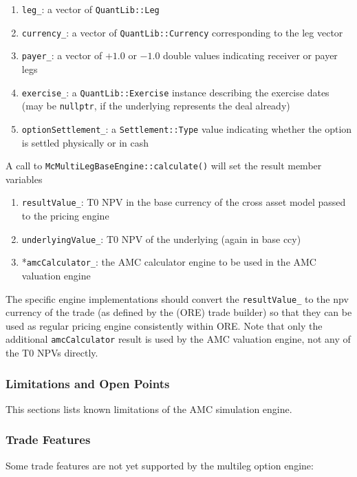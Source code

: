 \documentclass[12pt, a4paper]{article}
\begin{document}
{\begin{appendix}
\begin{enumerate}
\item \verb+leg_+: a vector of \verb+QuantLib::Leg+
\item \verb+currency_+: a vector of \verb+QuantLib::Currency+ corresponding to the leg vector
\item \verb+payer_+: a vector of $+1.0$ or $-1.0$ double values indicating receiver or payer legs
\item \verb+exercise_+: a \verb+QuantLib::Exercise+ instance describing the exercise dates (may be \verb+nullptr+, if
  the underlying represents the deal already)
\item \verb+optionSettlement_+: a \verb+Settlement::Type+ value indicating whether the option is settled physically or
  in cash
\end{enumerate}

A call to \verb+McMultiLegBaseEngine::calculate()+ will set the result member variables

\begin{enumerate}
\item \verb+resultValue_+: T0 NPV in the base currency of the cross asset model passed to the pricing engine
\item \verb+underlyingValue_+: T0 NPV of the underlying (again in base ccy)
\item *\verb+amcCalculator_+: the AMC calculator engine to be used in the AMC valuation engine
\end{enumerate}

The specific engine implementations should convert the \verb+resultValue_+ to the npv currency of the trade (as defined
by the (ORE) trade builder) so that they can be used as regular pricing engine consistently within ORE. Note that only
the additional \verb+amcCalculator+ result is used by the AMC valuation engine, not any of the T0 NPVs directly.

\subsubsection{Limitations and Open Points}
\label{sec:amc_limitations}

This sections lists known limitations of the AMC simulation engine.

\subsubsection*{Trade Features}

Some trade features are not yet supported by the multileg option engine:


\end{appendix}}
\end{document}
